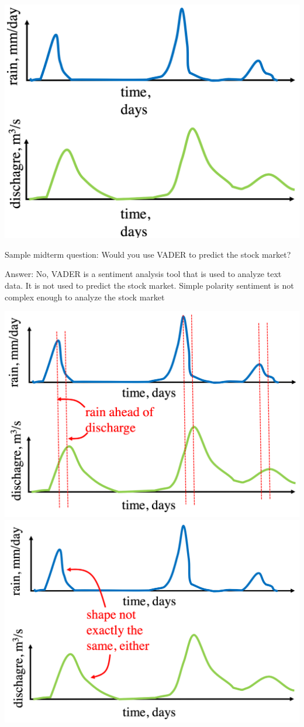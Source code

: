 \documentclass[11pt]{article}
\theoremstyle{definition}
\begin{document}
\includegraphics[width=\textwidth/2]{10.png}

Sample midterm question: Would you use VADER to predict the stock market?

Answer: No, VADER is a sentiment analysis tool that is used to analyze text data. It is not used to predict the stock market.
Simple polarity sentiment is not complex enough to analyze the stock market

\includegraphics[width=\textwidth/4]{11.png}
\includegraphics[width=\textwidth/4]{12.png}
\end{document}
